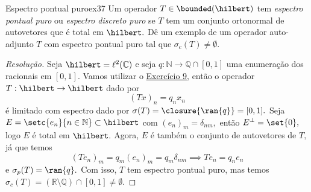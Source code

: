 \begin{exercício}{Espectro pontual puro}{ex37}
  Um operador \(T \in \bounded(\hilbert)\) tem \emph{espectro pontual puro} ou \emph{espectro discreto puro} se \(T\) tem um conjunto ortonormal de autovetores que é total em \(\hilbert.\) Dê um exemplo de um operador auto-adjunto \(T\) com espectro pontual puro tal que \(\sigma_c(T) \neq \emptyset.\)
\end{exercício}
\begin{proof}[Resolução]
  Seja \(\hilbert = \ell^2(\mathbb{C})\) e seja \(q : \mathbb{N} \to \mathbb{Q}\cap[0,1]\) uma enumeração dos racionais em \([0,1].\) Vamos utilizar o \href{https://github.com/louisradial/pgf5442-teoria-espectral/releases/tag/lista2}{Exercício 9}, então o operador \(T : \hilbert \to \hilbert\) dado por
  \begin{equation*}
    (Tx)_n = q_n x_n
  \end{equation*}
  é limitado com espectro dado por \(\sigma(T) = \closure{\ran{q}} = [0,1].\) Seja \(E = \setc{e_n}{n \in\mathbb{N}} \subset \hilbert\) com \((e_n)_m = \delta_{nm},\) então \(E^\perp = \set{0},\) logo \(E\) é total em \(\hilbert.\) Agora, \(E\) é também o conjunto de autovetores de \(T,\) já que temos
  \begin{equation*}
    (Te_n)_m = q_m (e_n)_m = q_{m}\delta_{nm} \implies Te_n = q_n e_n
  \end{equation*}
  e \(\sigma_p(T) = \ran{q}.\) Com isso, \(T\) tem espectro pontual puro, mas temos \(\sigma_c(T) = (\mathbb{R} \setminus \mathbb{Q}) \cap [0,1] \neq \emptyset.\)
\end{proof}
